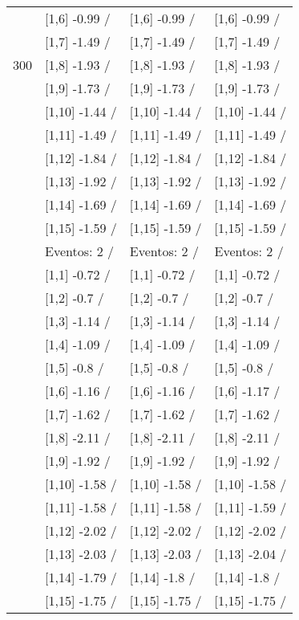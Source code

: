 \begin{table}
\begin{tabular}[t]{llll}
 & {}[1,6] -0.99  / & {}[1,6] -0.99  / & {}[1,6] -0.99  /\\
 & {}[1,7] -1.49  / & {}[1,7] -1.49  / & {}[1,7] -1.49  /\\
300 & {}[1,8] -1.93  / & {}[1,8] -1.93  / & {}[1,8] -1.93  /\\
\addlinespace
 & {}[1,9] -1.73  / & {}[1,9] -1.73  / & {}[1,9] -1.73  /\\
 & {}[1,10] -1.44  / & {}[1,10] -1.44  / & {}[1,10] -1.44  /\\
 & {}[1,11] -1.49  / & {}[1,11] -1.49  / & {}[1,11] -1.49  /\\
 & {}[1,12] -1.84  / & {}[1,12] -1.84  / & {}[1,12] -1.84  /\\
 & {}[1,13] -1.92  / & {}[1,13] -1.92  / & {}[1,13] -1.92  /\\
\addlinespace
 & {}[1,14] -1.69  / & {}[1,14] -1.69  / & {}[1,14] -1.69  /\\
 & {}[1,15] -1.59  / & {}[1,15] -1.59  / & {}[1,15] -1.59  /\\
 & Eventos:  2 / & Eventos:  2 / & Eventos:  2 /\\
 & {}[1,1] -0.72  / & {}[1,1] -0.72  / & {}[1,1] -0.72  /\\
 & {}[1,2] -0.7  / & {}[1,2] -0.7  / & {}[1,2] -0.7  /\\
\addlinespace
 & {}[1,3] -1.14  / & {}[1,3] -1.14  / & {}[1,3] -1.14  /\\
 & {}[1,4] -1.09  / & {}[1,4] -1.09  / & {}[1,4] -1.09  /\\
 & {}[1,5] -0.8  / & {}[1,5] -0.8  / & {}[1,5] -0.8  /\\
 & {}[1,6] -1.16  / & {}[1,6] -1.16  / & {}[1,6] -1.17  /\\
 & {}[1,7] -1.62  / & {}[1,7] -1.62  / & {}[1,7] -1.62  /\\
\addlinespace
500 & {}[1,8] -2.11  / & {}[1,8] -2.11  / & {}[1,8] -2.11  /\\
 & {}[1,9] -1.92  / & {}[1,9] -1.92  / & {}[1,9] -1.92  /\\
 & {}[1,10] -1.58  / & {}[1,10] -1.58  / & {}[1,10] -1.58  /\\
 & {}[1,11] -1.58  / & {}[1,11] -1.58  / & {}[1,11] -1.59  /\\
 & {}[1,12] -2.02  / & {}[1,12] -2.02  / & {}[1,12] -2.02  /\\
\addlinespace
 & {}[1,13] -2.03  / & {}[1,13] -2.03  / & {}[1,13] -2.04  /\\
 & {}[1,14] -1.79  / & {}[1,14] -1.8  / & {}[1,14] -1.8  /\\
 & {}[1,15] -1.75  / & {}[1,15] -1.75  / & {}[1,15] -1.75  /\\
\bottomrule
\end{tabular}
\end{table}
